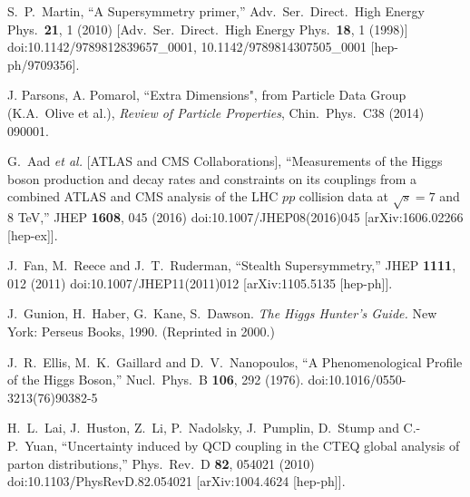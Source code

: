 \documentclass[letter,12pt]{article}
\begin{document}
\begin{thebibliography}{99}
  S.~P.~Martin,
  ``A Supersymmetry primer,''
  Adv.\ Ser.\ Direct.\ High Energy Phys.\  {\bf 21}, 1 (2010)
  [Adv.\ Ser.\ Direct.\ High Energy Phys.\  {\bf 18}, 1 (1998)]
  doi:10.1142/9789812839657\_0001, 10.1142/9789814307505\_0001
  [hep-ph/9709356].
  
  J. Parsons, A. Pomarol, ``Extra Dimensions", from Particle Data Group (K.A.~Olive et al.),
  {\it Review of Particle Properties}, Chin.\ Phys.\ C38 (2014) 090001.
  
  G.~Aad {\it et al.} [ATLAS and CMS Collaborations],
  ``Measurements of the Higgs boson production and decay rates and constraints on its couplings from a combined ATLAS and CMS analysis of the LHC $pp$ collision data at $ \sqrt{s}=7 $ and 8 TeV,''
  JHEP {\bf 1608}, 045 (2016)
  doi:10.1007/JHEP08(2016)045
  [arXiv:1606.02266 [hep-ex]].
  
  J.~Fan, M.~Reece and J.~T.~Ruderman,
  ``Stealth Supersymmetry,''
  JHEP {\bf 1111}, 012 (2011)
  doi:10.1007/JHEP11(2011)012
  [arXiv:1105.5135 [hep-ph]].
 
J.~Gunion, H.~Haber, G.~Kane, S.~Dawson. {\it The Higgs Hunter's Guide.} New York: Perseus Books, 1990. (Reprinted in 2000.)

  J.~R.~Ellis, M.~K.~Gaillard and D.~V.~Nanopoulos,
  ``A Phenomenological Profile of the Higgs Boson,''
  Nucl.\ Phys.\ B {\bf 106}, 292 (1976).
  doi:10.1016/0550-3213(76)90382-5


  H.~L.~Lai, J.~Huston, Z.~Li, P.~Nadolsky, J.~Pumplin, D.~Stump and C.-P.~Yuan,
  ``Uncertainty induced by QCD coupling in the CTEQ global analysis of parton distributions,''
  Phys.\ Rev.\ D {\bf 82}, 054021 (2010)
  doi:10.1103/PhysRevD.82.054021
  [arXiv:1004.4624 [hep-ph]].
  

\end{thebibliography}
\end{document}
